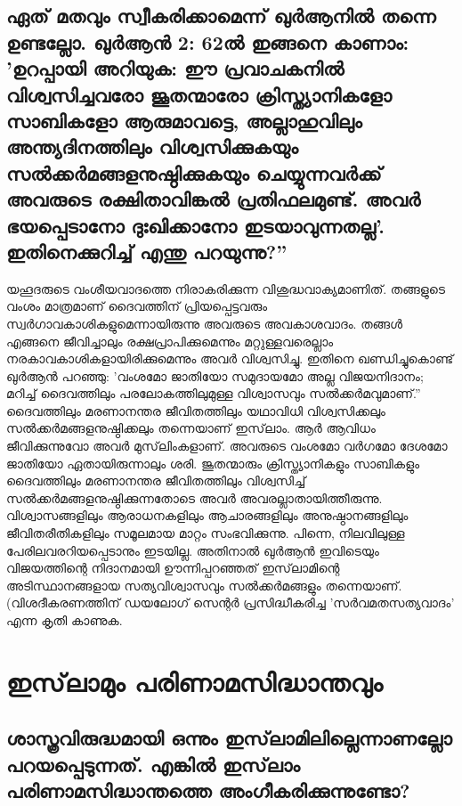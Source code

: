 \section{ഏത് മതവും സ്വീകരിക്കാമെന്ന് ഖുര്‍ആനില്‍ തന്നെ ഉണ്ടല്ലോ. ഖുര്‍ആന്‍ 2: 62ല്‍ ഇങ്ങനെ കാണാം: 'ഉറപ്പായി അറിയുക: ഈ പ്രവാചകനില്‍ വിശ്വസിച്ചവരോ ജൂതന്മാരോ ക്രിസ്ത്യാനികളോ സാബികളോ ആരുമാവട്ടെ, അല്ലാഹുവിലും അന്ത്യദിനത്തിലും വിശ്വസിക്കുകയും സല്‍ക്കര്‍മങ്ങളനുഷ്ഠിക്കുകയും ചെയ്യുന്നവര്‍ക്ക് അവരുടെ രക്ഷിതാവിങ്കല്‍ പ്രതിഫലമുണ്ട്. അവര്‍ ഭയപ്പെടാനോ ദുഃഖിക്കാനോ ഇടയാവുന്നതല്ല'. ഇതിനെക്കുറിച്ച് എന്തു പറയുന്നു?''}

യഹൂദരുടെ വംശീയവാദത്തെ നിരാകരിക്കുന്ന വിശുദ്ധവാക്യമാണിത്. തങ്ങളുടെ വംശം മാത്രമാണ് ദൈവത്തിന് പ്രിയപ്പെട്ടവരും സ്വര്‍ഗാവകാശികളുമെന്നായിരുന്നു അവരുടെ അവകാശവാദം. തങ്ങള്‍ എങ്ങനെ ജീവിച്ചാലും രക്ഷപ്രാപിക്കുമെന്നും മറ്റുള്ളവരെല്ലാം നരകാവകാശികളായിരിക്കുമെന്നും അവര്‍ വിശ്വസിച്ചു. ഇതിനെ ഖണ്ഡിച്ചുകൊണ്ട് ഖുര്‍ആന്‍ പറഞ്ഞു: 'വംശമോ ജാതിയോ സമുദായമോ അല്ല വിജയനിദാനം; മറിച്ച് ദൈവത്തിലും പരലോകത്തിലുമുള്ള വിശ്വാസവും സല്‍ക്കര്‍മവുമാണ്.''
ദൈവത്തിലും മരണാനന്തര ജീവിതത്തിലും യഥാവിധി വിശ്വസിക്കലും സല്‍ക്കര്‍മങ്ങളനുഷ്ഠിക്കലും തന്നെയാണ് ഇസ്‌ലാം. ആര്‍ ആവിധം ജീവിക്കുന്നുവോ അവര്‍ മുസ്‌ലിംകളാണ്. അവരുടെ വംശമോ വര്‍ഗമോ ദേശമോ ജാതിയോ ഏതായിരുന്നാലും ശരി. ജൂതന്മാരും ക്രിസ്ത്യാനികളും സാബികളും ദൈവത്തിലും മരണാനന്തര ജീവിതത്തിലും വിശ്വസിച്ച് സല്‍ക്കര്‍മങ്ങളനുഷ്ഠിക്കുന്നതോടെ അവര്‍ അവരല്ലാതായിത്തീരുന്നു. വിശ്വാസങ്ങളിലും ആരാധനകളിലും ആചാരങ്ങളിലും അനുഷ്ഠാനങ്ങളിലും ജീവിതരീതികളിലും സമൂലമായ മാറ്റം സംഭവിക്കുന്നു. പിന്നെ, നിലവിലുള്ള പേരിലവരറിയപ്പെടാനും ഇടയില്ല. അതിനാല്‍ ഖുര്‍ആന്‍ ഇവിടെയും വിജയത്തിന്റെ നിദാനമായി ഊന്നിപ്പറഞ്ഞത് ഇസ്‌ലാമിന്റെ അടിസ്ഥാനങ്ങളായ സത്യവിശ്വാസവും സല്‍ക്കര്‍മങ്ങളും തന്നെയാണ്.
(വിശദീകരണത്തിന് ഡയലോഗ് സെന്റര്‍ പ്രസിദ്ധീകരിച്ച 'സര്‍വമതസത്യവാദം' എന്ന കൃതി കാണുക.
\chapter{ഇസ്‌ലാമും പരിണാമസിദ്ധാന്തവും }
\section{ ശാസ്ത്രവിരുദ്ധമായി ഒന്നും ഇസ്‌ലാമിലില്ലെന്നാണല്ലോ പറയപ്പെടുന്നത്. എങ്കില്‍ ഇസ്‌ലാം പരിണാമസിദ്ധാന്തത്തെ അംഗീകരിക്കുന്നുണ്ടോ?}

